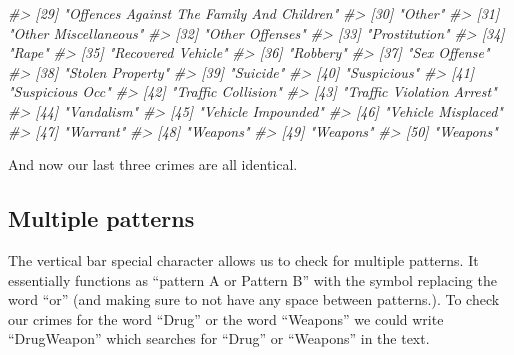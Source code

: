 \documentclass[
]{krantz}
\makeatletter
\newenvironment{Shaded}{\begin{snugshade}}{\end{snugshade}}
\newcommand{\CommentTok}[1]{\textcolor[rgb]{0.37,0.37,0.37}{\textit{#1}}}
\newenvironment{kframe}{%
\medskip{}
\setlength{\fboxsep}{.8em}
 \def\at@end@of@kframe{}%
 \ifinner\ifhmode%
  \def\at@end@of@kframe{\end{minipage}}%
  \begin{minipage}{\columnwidth}%
 \fi\fi%
 \def\FrameCommand##1{\hskip\@totalleftmargin \hskip-\fboxsep
 \colorbox{shadecolor}{##1}\hskip-\fboxsep
     \hskip-\linewidth \hskip-\@totalleftmargin \hskip\columnwidth}%
 \MakeFramed {\advance\hsize-\width
   \@totalleftmargin\z@ \linewidth\hsize
   \@setminipage}}%
 {\par\unskip\endMakeFramed%
 \at@end@of@kframe}
\renewenvironment{Shaded}{\begin{kframe}}{\end{kframe}}
\makeatother
\begin{document}
\begin{Shaded}
\begin{Highlighting}[]
\CommentTok{\#\textgreater{} [29] "Offences Against The Family And Children"  }
\CommentTok{\#\textgreater{} [30] "Other"                                     }
\CommentTok{\#\textgreater{} [31] "Other Miscellaneous"                       }
\CommentTok{\#\textgreater{} [32] "Other Offenses"                            }
\CommentTok{\#\textgreater{} [33] "Prostitution"                              }
\CommentTok{\#\textgreater{} [34] "Rape"                                      }
\CommentTok{\#\textgreater{} [35] "Recovered Vehicle"                         }
\CommentTok{\#\textgreater{} [36] "Robbery"                                   }
\CommentTok{\#\textgreater{} [37] "Sex Offense"                               }
\CommentTok{\#\textgreater{} [38] "Stolen Property"                           }
\CommentTok{\#\textgreater{} [39] "Suicide"                                   }
\CommentTok{\#\textgreater{} [40] "Suspicious"                                }
\CommentTok{\#\textgreater{} [41] "Suspicious Occ"                            }
\CommentTok{\#\textgreater{} [42] "Traffic Collision"                         }
\CommentTok{\#\textgreater{} [43] "Traffic Violation Arrest"                  }
\CommentTok{\#\textgreater{} [44] "Vandalism"                                 }
\CommentTok{\#\textgreater{} [45] "Vehicle Impounded"                         }
\CommentTok{\#\textgreater{} [46] "Vehicle Misplaced"                         }
\CommentTok{\#\textgreater{} [47] "Warrant"                                   }
\CommentTok{\#\textgreater{} [48] "Weapons"                                   }
\CommentTok{\#\textgreater{} [49] "Weapons"                                   }
\CommentTok{\#\textgreater{} [50] "Weapons"}
\end{Highlighting}
\end{Shaded}

And now our last three crimes are all identical.

\hypertarget{multiple-patterns}{%
\subsection{\texorpdfstring{Multiple patterns \texttt{\textbar{}}}{Multiple patterns \textbar{}}}\label{multiple-patterns}}

The vertical bar \texttt{\textbar{}} special character allows us to check for multiple patterns. It essentially functions as ``pattern A or Pattern B'' with the \texttt{\textbar{}} symbol replacing the word ``or'' (and making sure to not have any space between patterns.). To check our crimes for the word ``Drug'' or the word ``Weapons'' we could write ``Drug\textbar Weapon'' which searches for ``Drug'' or ``Weapons'' in the text.
\end{document}
